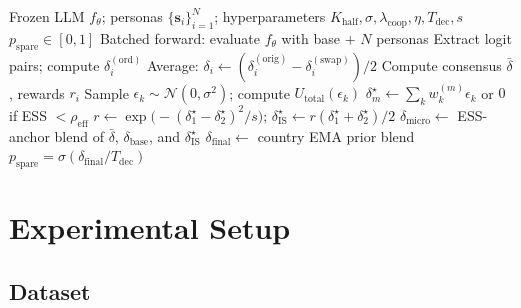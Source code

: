 \documentclass{article}
\begin{document}
\begin{algorithm}[t]
\caption{DISCA Inference for Scenario $\mathbf{x}$ in Country $c$}
\label{alg:swa}
\begin{algorithmic}[1]
\Require Frozen LLM $f_\theta$; personas $\{\mathbf{s}_i\}_{i=1}^{N}$;
         hyperparameters $K_{\text{half}},\sigma,\lambda_{\text{coop}},\eta,T_{\text{dec}},s$
\Ensure $p_{\text{spare}} \in [0,1]$
  \State Batched forward: evaluate $f_\theta$ with base + $N$ personas
  \State Extract logit pairs; compute $\delta_i^{(\text{ord})}$ \hfill{}
\EndFor
\State Average: $\delta_i \leftarrow (\delta_i^{(\text{orig})} - \delta_i^{(\text{swap})})/2$ \hfill\Comment{\S\ref{sec:method:debias}}
\State Compute consensus $\bar{\delta}$, rewards $r_i$ \hfill{}
    \State Sample $\epsilon_k \sim \mathcal{N}(0, \sigma^2)$; compute $U_{\text{total}}(\epsilon_k)$ \hfill{}
  \EndFor
  \State $\delta^{\star}_m \leftarrow \sum_k w_k^{(m)} \epsilon_k$ or $0$ if ESS $<\rho_{\mathrm{eff}}$ \hfill\Comment{\S\ref{sec:method:dpbr}}
\EndFor
\State $r \leftarrow \exp\bigl(-(\delta^{\star}_1-\delta^{\star}_2)^2/s\bigr)$;
       $\delta^{\star}_{\mathrm{IS}} \leftarrow r(\delta^{\star}_1+\delta^{\star}_2)/2$ \hfill{}
\State $\delta_{\mathrm{micro}} \leftarrow$ ESS-anchor blend of $\bar{\delta}$, $\delta_{\text{base}}$, and $\delta^{\star}_{\mathrm{IS}}$ \hfill{}
\State $\delta_{\text{final}} \leftarrow$ country EMA prior blend \hfill\Comment{\S\ref{sec:method:prior}}
\State \Return $p_{\text{spare}} = \sigma(\delta_{\text{final}} / T_{\text{dec}})$
\end{algorithmic}
\end{algorithm}

%

\section{Experimental Setup}
\label{sec:experiments}

\subsection{Dataset}
\label{sec:exp:data}
\end{document}
